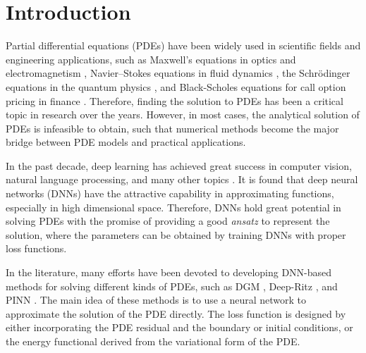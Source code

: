 \documentclass[hyperref]{article}
\numberwithin{equation}{section}
\theoremstyle{nonumberplain}
\begin{document}
	\section{Introduction}
	\label{Introduction}
	Partial differential equations (PDEs) have been widely used in %
	scientific fields and engineering applications, such as Maxwell's equations in optics and electromagnetism \cite{griffiths2005introduction},
	Navier–Stokes equations in fluid dynamics \cite{temam2001navier}, the Schr\"{o}dinger equations in the quantum physics \cite{schrodinger1926undulatory}, and Black-Scholes equations for call option pricing in finance \cite{macbeth1979empirical}. Therefore, finding the solution to PDEs has been a critical topic in research over the years. However, in most cases, the analytical solution of PDEs is infeasible to obtain, such that numerical methods become the major bridge between PDE models and practical applications.
	
	In the past decade, deep learning has achieved great success in computer vision, natural language processing, and many other topics \cite{goodfellow2016deep}. It is found that deep neural networks (DNNs) have the attractive capability in approximating functions, especially in high dimensional space. Therefore, DNNs hold great potential in solving PDEs with the promise of providing a good \emph{ansatz} to represent the solution, where the parameters can be obtained by training DNNs with proper loss functions.
	
	In the literature, many efforts have been devoted to developing DNN-based methods for solving different kinds of PDEs, 
	such as DGM \cite{sirignano2018dgm}, Deep-Ritz \cite{weinan2018deep}, and PINN \cite{raissi2019physics}. The main idea of these methods is to use a neural network to approximate the solution of the PDE directly. The loss function is designed by either incorporating the PDE residual and the boundary or initial conditions, or the energy functional derived from the variational form of the PDE. 
	
\end{document}
